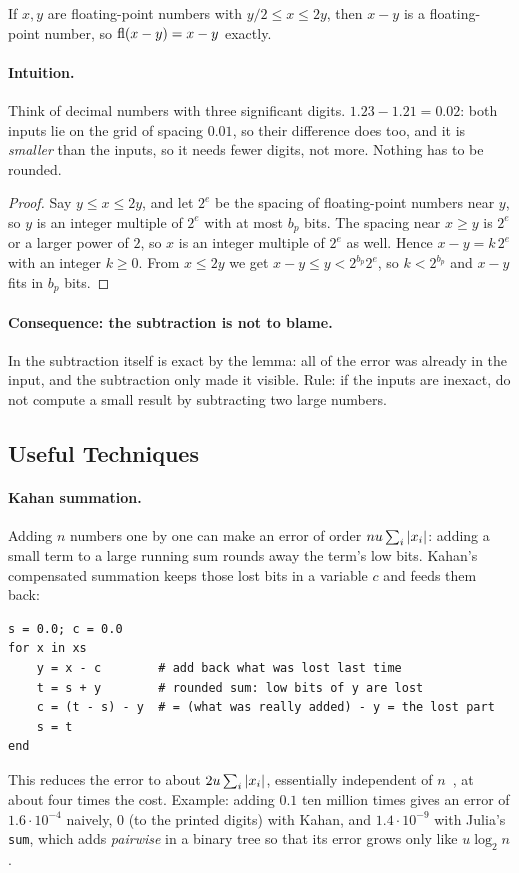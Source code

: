 \begin{lemma}[Sterbenz]
  \label{lem:sterbenz}
  If $x, y$ are floating-point numbers with $y/2 \le x \le 2y$, then $x - y$ is a floating-point number, so $\operatorname{fl}(x - y) = x - y$ exactly.
\end{lemma}

\paragraph{Intuition.} Think of decimal numbers with three significant digits. $1.23 - 1.21 = 0.02$: both inputs lie on the grid of spacing $0.01$, so their difference does too, and it is \emph{smaller} than the inputs, so it needs fewer digits, not more. Nothing has to be rounded.

\begin{proof}
  Say $y \le x \le 2y$, and let $2^e$ be the spacing of floating-point numbers near $y$, so $y$ is an integer multiple of $2^e$ with at most $b_p$ bits. The spacing near $x \ge y$ is $2^e$ or a larger power of $2$, so $x$ is an integer multiple of $2^e$ as well. Hence $x - y = k\,2^e$ with an integer $k \ge 0$. From $x \le 2y$ we get $x - y \le y < 2^{b_p}2^e$, so $k < 2^{b_p}$ and $x - y$ fits in $b_p$ bits.
\end{proof}

\paragraph{Consequence: the subtraction is not to blame.} In  the subtraction itself is exact by the lemma: all of the error was already in the input, and the subtraction only made it visible. Rule: if the inputs are inexact, do not compute a small result by subtracting two large numbers.

\subsection{Useful Techniques}

\paragraph{Kahan summation.} Adding $n$ numbers one by one can make an error of order $nu\sum_i\left\lvert x_i \right\rvert$: adding a small term to a large running sum rounds away the term's low bits. Kahan's compensated summation keeps those lost bits in a variable $c$ and feeds them back:
\begin{lstlisting}
s = 0.0; c = 0.0
for x in xs
    y = x - c        # add back what was lost last time
    t = s + y        # rounded sum: low bits of y are lost
    c = (t - s) - y  # = (what was really added) - y = the lost part
    s = t
end
\end{lstlisting}
This reduces the error to about $2u\sum_i\left\lvert x_i \right\rvert$, essentially independent of $n$~\cite{Higham}, at about four times the cost. Example: adding $0.1$ ten million times gives an error of $1.6 \cdot 10^{-4}$ naively, $0$ (to the printed digits) with Kahan, and $1.4 \cdot 10^{-9}$ with Julia's \texttt{sum}, which adds \emph{pairwise} in a binary tree so that its error grows only like $u\log_2 n$.

